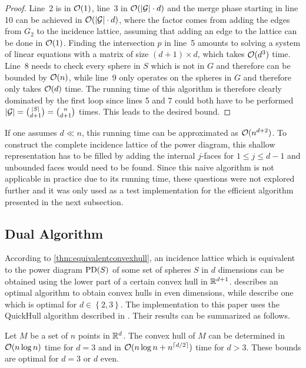 \begin{proof}
    Line~2 is in $\mathcal{O}(1)$, line~3 in $\mathcal{O}(\left\vert \mathcal{G} \right\vert \cdot d)$ and the merge phase starting in line 10 can be achieved in $\mathcal{O}(\left\vert \mathcal{G} \right\vert \cdot d)$, where the factor comes from adding the edges from $G_2$ to the incidence lattice, assuming that adding an edge to the lattice can be done in $\mathcal{O}(1)$.
    Finding the intersection $p$ in line~5 amounts to solving a system of linear equations with a matrix of size $(d+1) \times d$, which takes $\mathcal{O}(d^3)$ time.
    Line~8 needs to check every sphere in $S$ which is not in $G$ and therefore can be bounded by $\mathcal{O}(n)$, while line~9 only operates on the spheres in $G$ and therefore only takes $\mathcal{O}(d)$ time.
    The running time of this algorithm is therefore clearly dominated by the first loop since lines 5 and 7 could both have to be performed $\left\vert \mathcal{G} \right\vert = \binom{\left\vert S \right\vert}{d + 1} = \binom{n}{d + 1}$ times.
    This leads to the desired bound.
\end{proof}

If one assumes $d \ll n$, this running time can be approximated as $\mathcal{O}(n^{d+2})$.
To construct the complete incidence lattice of the power diagram, this shallow representation has to be filled by adding the internal $j$-faces for $1 \leq j \leq d -1$ and unbounded faces would need to be found.
Since this naive algorithm is not applicable in practice due to its running time, these questions were not explored further and it was only used as a test implementation for the efficient algorithm presented in the next subsection.

\subsection{Dual Algorithm}
\label{sub:dual_algorithm}
According to \cref{thm:equivalentconvexhull}, an incidence lattice which is equivalent to the power diagram $\operatorname{PD}(S)$ of some set of spheres $S$ in $d$ dimensions can be obtained using the lower part of a certain convex hull in $\mathbb{R}^{d+1}$.
\Textcite{seidel1981convex} describes an optimal algorithm to obtain convex hulls in even dimensions, while \textcite{preparata1977convex} describe one which is optimal for $d \in \left\{ 2, 3 \right\}$.
The implementation to this paper uses the QuickHull algorithm described in \cite{barber1996quickhull}.
Their results can be summarized as follows.
\begin{lemma}
    \label{lem:convexhulls}
    Let $M$ be a set of $n$ points in $\mathbb{R}^d$.
    The convex hull of $M$ can be determined in $\mathcal{O}(n \log n)$ time for $d = 3$ and in $\mathcal{O}(n \log n + n^{\left\lceil d/2\right\rceil})$ time for $d > 3$.
    These bounds are optimal for $d = 3$ or $d$ even.
\end{lemma}

